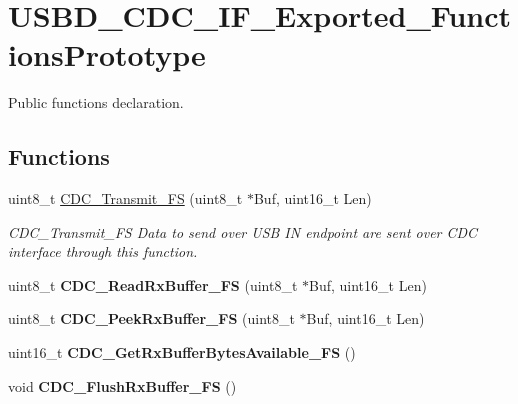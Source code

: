 \hypertarget{group__USBD__CDC__IF__Exported__FunctionsPrototype}{}\section{U\+S\+B\+D\+\_\+\+C\+D\+C\+\_\+\+I\+F\+\_\+\+Exported\+\_\+\+Functions\+Prototype}
\label{group__USBD__CDC__IF__Exported__FunctionsPrototype}


Public functions declaration.  


\subsection*{Functions}
\begin{DoxyCompactItemize}
\item 
uint8\+\_\+t \hyperlink{group__USBD__CDC__IF__Exported__FunctionsPrototype_ga5137d6201dbdef2bf351c5b4941c24f4}{C\+D\+C\+\_\+\+Transmit\+\_\+\+FS} (uint8\+\_\+t $\ast$Buf, uint16\+\_\+t Len)
\begin{DoxyCompactList}\small\item\em C\+D\+C\+\_\+\+Transmit\+\_\+\+FS Data to send over U\+SB IN endpoint are sent over C\+DC interface through this function. \end{DoxyCompactList}\item 
\mbox{\label{group__USBD__CDC__IF__Exported__FunctionsPrototype_gaead3fffa49044739a80019b38773e737}} 
uint8\+\_\+t {\bfseries C\+D\+C\+\_\+\+Read\+Rx\+Buffer\+\_\+\+FS} (uint8\+\_\+t $\ast$Buf, uint16\+\_\+t Len)
\item 
\mbox{\label{group__USBD__CDC__IF__Exported__FunctionsPrototype_gabad1adbe14c715be19809826ef138ee6}} 
uint8\+\_\+t {\bfseries C\+D\+C\+\_\+\+Peek\+Rx\+Buffer\+\_\+\+FS} (uint8\+\_\+t $\ast$Buf, uint16\+\_\+t Len)
\item 
\mbox{\label{group__USBD__CDC__IF__Exported__FunctionsPrototype_ga315db679a6baef461e36e4004875497e}} 
uint16\+\_\+t {\bfseries C\+D\+C\+\_\+\+Get\+Rx\+Buffer\+Bytes\+Available\+\_\+\+FS} ()
\item 
\mbox{\label{group__USBD__CDC__IF__Exported__FunctionsPrototype_gad0a4aef5cb4eebc6896b8d97da7c2ac6}} 
void {\bfseries C\+D\+C\+\_\+\+Flush\+Rx\+Buffer\+\_\+\+FS} ()
\end{DoxyCompactItemize}


